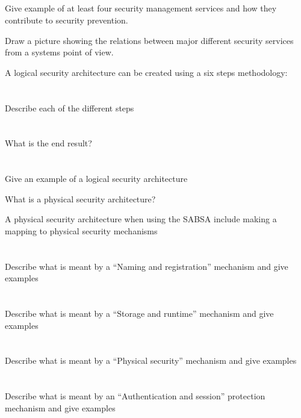 \begin{questions}
\begin{parts}
  \part{} Give example of at least four security management services and how they contribute to security prevention.
  \end{parts}

\item Draw a picture showing the relations between major different security services from a systems point of view.
\item A logical security architecture can be created using a six steps methodology:
  \begin{parts}
  \part{} Describe each of the different steps
  \part{} What is the end result?
  \part{} Give an example of a logical security architecture
  \end{parts}

\item What is a physical security architecture?
\item A physical security architecture when using the SABSA include making a mapping to physical security mechanisms
  \begin{parts}
  \part{} Describe what is meant by a ``Naming and registration'' mechanism and give examples
  \part{} Describe what is meant by a ``Storage and runtime'' mechanism and give examples
  \part{} Describe what is meant by a ``Physical security'' mechanism and give examples
  \part{} Describe what is meant by an ``Authentication and session'' protection mechanism and give examples

\end{parts}
\end{questions}
